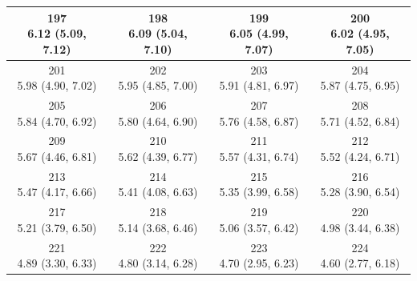 \begin{table}[htbp]
\begin{tabular}{cccc}
\hline
\shortstack[c]{197\\6.12 (5.09, 7.12)} & \shortstack[c]{198\\6.09 (5.04, 7.10)} & \shortstack[c]{199\\6.05 (4.99, 7.07)} & \shortstack[c]{200\\6.02 (4.95, 7.05)} \\
\hline
\shortstack[c]{201\\5.98 (4.90, 7.02)} & \shortstack[c]{202\\5.95 (4.85, 7.00)} & \shortstack[c]{203\\5.91 (4.81, 6.97)} & \shortstack[c]{204\\5.87 (4.75, 6.95)} \\
\hline
\shortstack[c]{205\\5.84 (4.70, 6.92)} & \shortstack[c]{206\\5.80 (4.64, 6.90)} & \shortstack[c]{207\\5.76 (4.58, 6.87)} & \shortstack[c]{208\\5.71 (4.52, 6.84)} \\
\hline
\shortstack[c]{209\\5.67 (4.46, 6.81)} & \shortstack[c]{210\\5.62 (4.39, 6.77)} & \shortstack[c]{211\\5.57 (4.31, 6.74)} & \shortstack[c]{212\\5.52 (4.24, 6.71)} \\
\hline
\shortstack[c]{213\\5.47 (4.17, 6.66)} & \shortstack[c]{214\\5.41 (4.08, 6.63)} & \shortstack[c]{215\\5.35 (3.99, 6.58)} & \shortstack[c]{216\\5.28 (3.90, 6.54)} \\
\hline
\shortstack[c]{217\\5.21 (3.79, 6.50)} & \shortstack[c]{218\\5.14 (3.68, 6.46)} & \shortstack[c]{219\\5.06 (3.57, 6.42)} & \shortstack[c]{220\\4.98 (3.44, 6.38)} \\
\hline
\shortstack[c]{221\\4.89 (3.30, 6.33)} & \shortstack[c]{222\\4.80 (3.14, 6.28)} & \shortstack[c]{223\\4.70 (2.95, 6.23)} & \shortstack[c]{224\\4.60 (2.77, 6.18)} \\
\hline
\end{tabular}
\end{table}